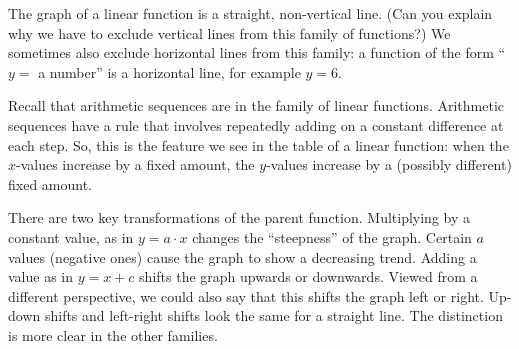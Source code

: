 The graph of a linear function is a straight, non-vertical line. (Can you explain why we have to exclude vertical lines from this family of functions?) We sometimes also exclude horizontal lines from this family: a function of the form ``$y=$ a number'' is a horizontal line, for example $y = 6$.

Recall that arithmetic sequences are in the family of linear functions. Arithmetic sequences have a rule that involves repeatedly adding on a constant difference at each step. So, this is the feature we see in the table of a linear function: when the $x$-values increase by a fixed amount, the $y$-values increase by a (possibly different) fixed amount.

There are two key transformations of the parent function. Multiplying by a constant value, as in $y=a \cdot x$ changes the ``steepness'' of the graph. Certain $a$ values (negative ones) cause the graph to show a decreasing trend. Adding a value as in $y=x + c$ shifts the graph upwards or downwards. Viewed from a different perspective, we could also say that this shifts the graph left or right. Up-down shifts and left-right shifts look the same for a straight line. The distinction is more clear in the other families.



